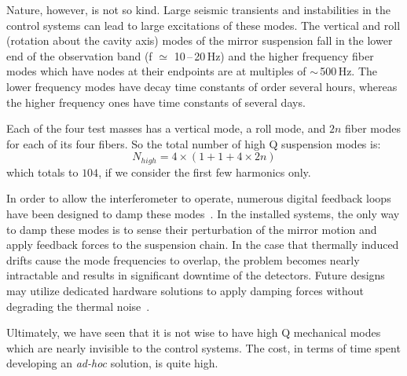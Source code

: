 Nature, however, is not so kind. Large seismic transients and instabilities in the control systems can lead to large excitations of these modes. The vertical and roll (rotation about the cavity axis)
modes of the mirror suspension fall in the lower end of the observation band
(f $\simeq$ 10\,--\,20\,Hz) and the higher frequency fiber modes which have nodes at
their endpoints are at multiples of $\sim$\,500\,Hz. The lower frequency modes have
decay time constants of order several hours, whereas the higher frequency ones
have time constants of several days.

Each of the four test masses has a vertical mode, a roll mode, and $2n$ fiber modes
for each of its four fibers. So the total number of high Q suspension modes is:
\begin{equation}
N_{high} = 4 \times (1 + 1 + 4 \times 2n)
\end{equation}
which totals to $104$, if we consider the first few harmonics only.

In order to allow the interferometer to operate, numerous digital feedback
loops have been designed to damp these modes~\cite{martynov2015lock, Miller:ESD}. In the
installed systems, the only way to damp these modes is to sense their perturbation
of the mirror motion and apply feedback forces to the suspension chain. In the case
that thermally induced drifts cause the mode frequencies to overlap, the problem
becomes nearly intractable and results in significant downtime of the detectors. Future designs may utilize dedicated hardware solutions to apply damping forces without degrading the thermal noise~\cite{Dmitriev:2010hk, Lockerbie:2011zma}.

Ultimately, we have seen that it is not wise to have high Q mechanical modes
which are nearly invisible to the control systems. The cost, in terms of time
spent developing an \emph{ad-hoc} solution, is quite high.



